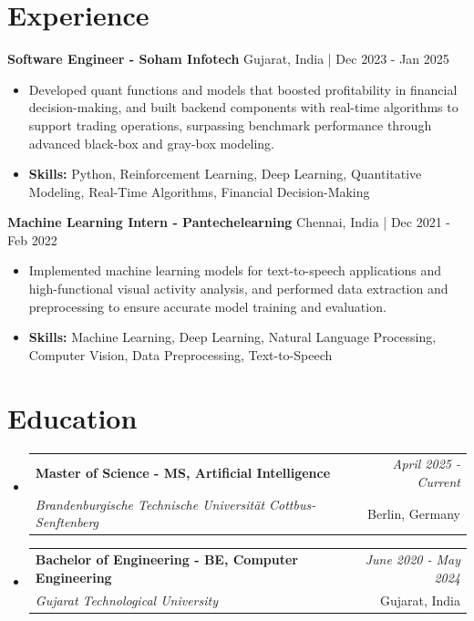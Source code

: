 \documentclass[a4paper,11pt]{article}
\makeatletter
\newcommand{\resumeSubheading}[4]{
\vspace{0.5mm}\item
    \begin{tabular*}{\linewidth}[t]{l@{\extracolsep{\fill}}r}
        \textbf{#1} & \textit{\footnotesize{#4}} \\
        \textit{\footnotesize{#3}} &  \footnotesize{#2}\\
    \end{tabular*}
    \vspace{-2.4mm}
}
\makeatother
\begin{document}
\section{\textbf{Experience}}


\vspace{1mm}
  \textbf{Software Engineer - Soham Infotech} \hfill Gujarat, India | Dec 2023 - Jan 2025
\vspace{-1.5mm} %
\begin{itemize}
  \item Developed quant functions and models that boosted profitability in financial decision-making, and built backend components with real-time algorithms to support trading operations, surpassing benchmark performance through advanced black-box and gray-box modeling.

\vspace{-2mm}
  \item \textbf{Skills:} Python, Reinforcement Learning, Deep Learning, Quantitative Modeling, Real-Time Algorithms, Financial Decision-Making
\end{itemize}

\vspace{1mm}
  \textbf{Machine Learning Intern - Pantechelearning} \hfill Chennai, India | Dec 2021 - Feb 2022
\vspace{-1.5mm} %
\begin{itemize}
  \item Implemented machine learning models for text-to-speech applications and high-functional visual activity analysis, and performed data extraction and preprocessing to ensure accurate model training and evaluation.
\vspace{-2mm}
  \item \textbf{Skills:} Machine Learning, Deep Learning, Natural Language Processing, Computer Vision, Data Preprocessing, Text-to-Speech
\end{itemize}\section{\textbf{Education}}
\vspace{-0.4mm}

\begin{itemize}[leftmargin=0.15in, label={}]
\resumeSubheading
{Master of Science - MS, Artificial Intelligence }{Berlin, Germany}
{Brandenburgische Technische Universität Cottbus-Senftenberg  }{April 2025 - Current}

\vspace{1.0mm} %
\resumeSubheading
{Bachelor of Engineering - BE, Computer Engineering  }{Gujarat, India}
{Gujarat Technological University }{June 2020 - May 2024}

\end{itemize}
\end{document}
